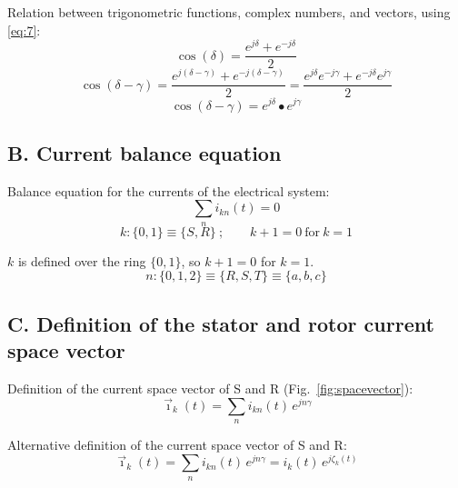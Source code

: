 \documentclass[11pt,a4paper]{article}
\begin{document}
Relation between trigonometric functions, complex numbers, and vectors, using \eqref{eq:7}:
\begin{equation}\tag{10}\label{eq:10}
\cos(\delta) = \frac{e^{j\delta}+e^{-j\delta}}{2}
\end{equation}
\begin{equation}\tag{11}\label{eq:11}
\cos(\delta-\gamma) = \frac{e^{j(\delta-\gamma)}+e^{-j(\delta-\gamma)}}{2} = \frac{e^{j\delta}e^{-j\gamma}+e^{-j\delta}e^{j\gamma}}{2}
\end{equation}
\begin{equation}\tag{12}\label{eq:12}
\cos(\delta-\gamma) = e^{j\delta}\bullet e^{j\gamma}
\end{equation}

\subsection*{B. Current balance equation}

Balance equation for the currents of the electrical system:
\begin{equation}\tag{13}\label{eq:13}
\sum_n i_{kn}(t) = 0
\end{equation}
\begin{equation}\tag{14}\label{eq:14}
k:\{0,1\}\equiv\{S,R\}\ ;\qquad k+1=0\ \text{for}\ k=1
\end{equation}

$k$ is defined over the ring $\{0,1\}$, so $k+1=0$ for $k=1$.
\begin{equation}\tag{15}\label{eq:15}
n:\{0,1,2\}\equiv\{R,S,T\}\equiv\{a,b,c\}
\end{equation}

\subsection*{C. Definition of the stator and rotor current space vector}

Definition of the current space vector of S and R (Fig.~\ref{fig:spacevector}):
\begin{equation}\tag{16}\label{eq:16}
\vec\imath_k(t) = \sum_n i_{kn}(t)\,e^{jn\gamma}
\end{equation}

Alternative definition of the current space vector of S and R:
\begin{equation}\tag{17}\label{eq:17}
\vec\imath_k(t) = \sum_n i_{kn}(t)\,e^{jn\gamma} = i_k(t)\,e^{j\zeta_k(t)}
\end{equation}
\end{document}
